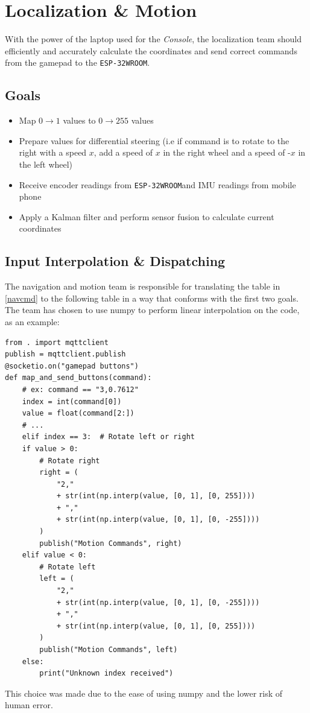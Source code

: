 \documentclass[a4paper,12pt]{article}
\newcommand{\sz}{\text{-}}
\newcommand{\esp}{\texttt{ESP-32WROOM}}
\newcommand{\con}{\textit{Console}}
\begin{document}
\section{Localization \& Motion}
With the power of the laptop used for the \con, the localization team should efficiently and accurately calculate the coordinates and send correct commands from the gamepad to the \esp.

\subsection*{Goals}

\begin{itemize}
    \item Map $0 \rightarrow 1$ values to $0 \rightarrow 255$ values
    \item Prepare values for differential steering (i.e if command is to rotate to the right with a speed $x$, add a speed of $x$ in the right wheel and a speed of $\sz x$ in the left wheel)
    \item Receive encoder readings from \esp and IMU readings from mobile phone
    \item Apply a Kalman filter and perform sensor fusion to calculate current coordinates
\end{itemize}

\subsection{Input Interpolation \& Dispatching}
The navigation and motion team is responsible for translating the table in \ref{navcmd} to the following table in a way that conforms with the first two goals. The team has chosen to use numpy to perform linear interpolation on the code, as an example:
\begin{lstlisting}
from . import mqttclient
publish = mqttclient.publish
@socketio.on("gamepad buttons")
def map_and_send_buttons(command):
    # ex: command == "3,0.7612"
    index = int(command[0])
    value = float(command[2:])
    # ...
    elif index == 3:  # Rotate left or right
    if value > 0:
        # Rotate right
        right = (
            "2,"
            + str(int(np.interp(value, [0, 1], [0, 255])))
            + ","
            + str(int(np.interp(value, [0, 1], [0, -255])))
        )
        publish("Motion Commands", right)
    elif value < 0:
        # Rotate left
        left = (
            "2,"
            + str(int(np.interp(value, [0, 1], [0, -255])))
            + ","
            + str(int(np.interp(value, [0, 1], [0, 255])))
        )
        publish("Motion Commands", left)
    else:
        print("Unknown index received")
\end{lstlisting}
This choice was made due to the ease of using numpy and the lower risk of human error.
\end{document}
